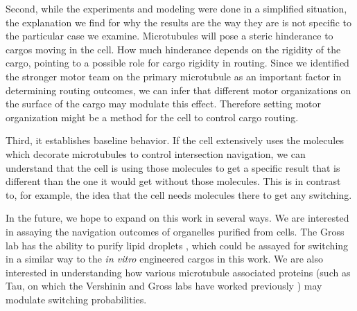 Second, while the experiments and modeling were done in a simplified situation, the explanation we find for why the results are the way they are is not specific to the particular case we examine.
Microtubules will pose a steric hinderance to cargos moving in the cell.
How much hinderance depends on the rigidity of the cargo, pointing to a possible role for cargo rigidity in routing. 
Since we identified the stronger motor team on the primary microtubule as an important factor in determining routing outcomes, we can infer that different motor organizations on the surface of the cargo may modulate this effect.
Therefore setting motor organization might be a method for the cell to control cargo routing.

Third, it establishes baseline behavior. If the cell extensively uses the molecules which decorate microtubules to control intersection navigation, we can understand that the cell is using those molecules to get a specific result that is different than the one it would get without those molecules. This is in contrast to, for example, the idea that the cell needs molecules there to get any switching.

In the future, we hope to expand on this work in several ways. We are interested in assaying the navigation outcomes of organelles purified from cells. The Gross lab has the ability to purify lipid droplets \cite{Reddy2016}, which could be assayed for switching in a similar way to the \textit{in vitro} engineered cargos in this work. We are also interested in understanding how various microtubule associated proteins (such as Tau, on which the Vershinin and Gross labs have worked previously \cite{Vershinin2007}) may modulate switching probabilities. 
